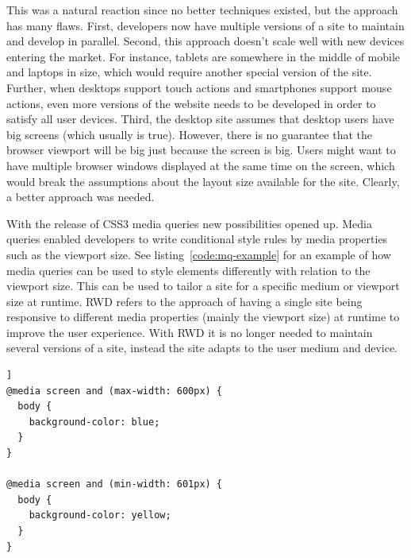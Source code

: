 \documentclass[a4paper,11pt]{kth-mag}
\begin{document}
        This was a natural reaction since no better techniques existed, but the approach has many flaws.
        First, developers now have multiple versions of a site to maintain and develop in parallel.
        Second, this approach doesn't scale well with new devices entering the market.
        For instance, tablets are somewhere in the middle of mobile and laptops in size, which would require another special version of the site.
        Further, when desktops support touch actions and smartphones support mouse actions, even more versions of the website needs to be developed in order to satisfy all user devices.
        Third, the desktop site assumes that desktop users have big screens (which usually is true).
        However, there is no guarantee that the \gls{browser} \gls{viewport} will be big just because the screen is big.
        Users might want to have multiple \gls{browser} windows displayed at the same time on the screen, which would break the assumptions about the layout size available for the site.
        Clearly, a better approach was needed.

        With the release of \gls{CSS3} \gls{media queries} new possibilities opened up.
        Media queries enabled developers to write conditional style rules by media properties such as the \gls{viewport} size.
        See listing~\ref{code:mq-example} for an example of how \gls{media queries} can be used to style \glspl{element} differently with relation to the viewport size.
        This can be used to tailor a site for a specific medium or \gls{viewport} size at runtime.
        \gls{RWD} refers to the approach of having a single site being \gls{responsive} to different media properties (mainly the \gls{viewport} size) at runtime to improve the user experience.
        With \gls{RWD} it is no longer needed to maintain several versions of a site, instead the site adapts to the user medium and device.

        \begin{lstlisting}[label={code:mq-example},caption={The above \gls{CSS} styles the body of the website blue if the \gls{viewport} is less or equal to 600 pixels wide, and yellow otherwise.},captionpos=b]]
@media screen and (max-width: 600px) {
  body {
    background-color: blue;
  }
}

@media screen and (min-width: 601px) {
  body {
    background-color: yellow;
  }
}
        \end{lstlisting}
\end{document}

